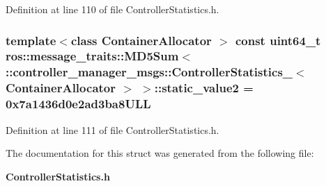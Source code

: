 \-Definition at line 110 of file \-Controller\-Statistics.\-h.

\subsubsection[{static\-\_\-value2}]{\setlength{\rightskip}{0pt plus 5cm}template$<$class Container\-Allocator $>$ const uint64\-\_\-t ros\-::message\-\_\-traits\-::\-M\-D5\-Sum$<$ \-::{\bf controller\-\_\-manager\-\_\-msgs\-::\-Controller\-Statistics\-\_\-}$<$ \-Container\-Allocator $>$ $>$\-::{\bf static\-\_\-value2} = 0x7a1436d0e2ad3ba8\-U\-L\-L\hspace{0.3cm}{\ttfamily  [static]}}\label{structros_1_1message__traits_1_1MD5Sum_3_01_1_1controller__manager__msgs_1_1ControllerStatistics9738ed3765ef33d8fb8040d3564cc11c_a5dbd2a90837db774dd4b9fc14793e869}


\-Definition at line 111 of file \-Controller\-Statistics.\-h.



\-The documentation for this struct was generated from the following file\-:\begin{DoxyCompactItemize}
\item 
{\bf \-Controller\-Statistics.\-h}\end{DoxyCompactItemize}
